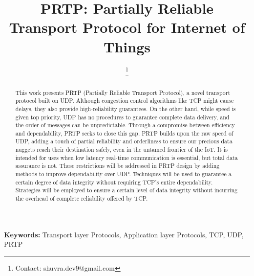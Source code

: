 \documentclass[lettersize,journal]{IEEEtran}
\begin{document}
\title{PRTP: Partially Reliable Transport Protocol for Internet of Things}

\author{
	


\thanks{Contact: shuvra.dev9@gmail.com}
}


\maketitle

\begin{abstract}
This work presents PRTP (Partially Reliable Transport Protocol), a novel transport protocol built on UDP. Although congestion control algorithms like TCP might cause delays, they also provide high-reliability guarantees. On the other hand, while speed is given top priority, UDP has no procedures to guarantee complete data delivery, and the order of messages can be unpredictable. Through a compromise between efficiency and dependability, PRTP seeks to close this gap. PRTP builds upon the raw speed of UDP, adding a touch of partial reliability and orderliness to ensure our precious data nuggets reach their destination safely, even in the untamed frontier of the IoT. It is intended for uses when low latency real-time communication is essential, but total data assurance is not. These restrictions will be addressed in PRTP design by adding methods to improve dependability over UDP. Techniques will be used to guarantee a certain degree of data integrity without requiring TCP's entire dependability. Strategies will be employed to ensure a certain level of data integrity without incurring the overhead of complete reliability offered by TCP.
\end{abstract}

\textbf{Keywords:} Transport layer Protocols, Application layer Protocols, TCP, UDP, PRTP
\end{document}
